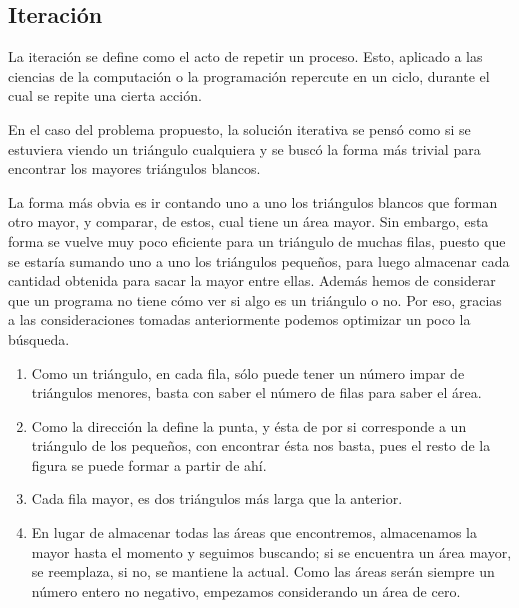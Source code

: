 \documentclass[letterpaper]{article}
\begin{document}
  \subsection{Iteraci\'on}
  La iteraci\'on se define como el acto de repetir un proceso. Esto, aplicado a las
  ciencias de la computaci\'on o la programaci\'on repercute en un ciclo, durante
  el cual se repite una cierta acci\'on.\par
  En el caso del problema propuesto, la soluci\'on iterativa se pens\'o como si
  se estuviera viendo un tri\'angulo cualquiera y se busc\'o la forma m\'as trivial
  para encontrar los mayores tri\'angulos blancos.\par
  La forma m\'as obvia es ir contando uno a uno los tri\'angulos blancos que forman
  otro mayor, y comparar, de estos, cual tiene un \'area mayor. Sin embargo, esta
  forma se vuelve muy poco eficiente para un tri\'angulo de muchas filas, puesto
  que se estar\'ia sumando uno a uno los tri\'angulos peque\~nos, para luego almacenar
  cada cantidad obtenida para sacar la mayor entre ellas. Adem\'as hemos de considerar
  que un programa no tiene c\'omo ver si algo es un tri\'angulo o no. Por eso, gracias
  a las consideraciones tomadas anteriormente podemos optimizar un poco la b\'usqueda.
  \begin{enumerate}
    \item Como un tri\'angulo, en cada fila, s\'olo puede tener un n\'umero impar de
    tri\'angulos menores, basta con saber el n\'umero de filas para saber el \'area.
    \item Como la direcci\'on la define la punta, y \'esta de por si corresponde a
    un tri\'angulo de los peque\~nos, con encontrar \'esta nos basta, pues el resto de la
    figura se puede formar a partir de ah\'i.
    \item Cada fila mayor, es dos tri\'angulos m\'as larga que la anterior.
    \item En lugar de almacenar todas las \'areas que encontremos, almacenamos la
    mayor hasta el momento y seguimos buscando; si se encuentra un \'area mayor, se
    reemplaza, si no, se mantiene la actual. Como las \'areas ser\'an siempre un
    n\'umero entero no negativo, empezamos considerando un \'area de cero.
  \end{enumerate}
\end{document}

